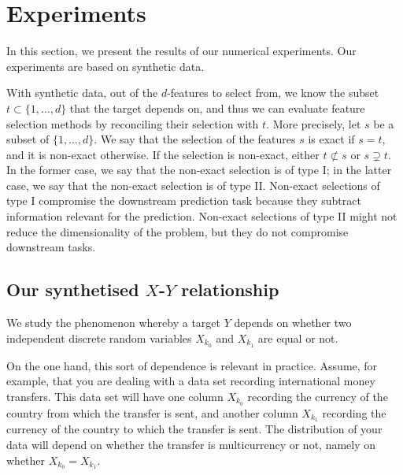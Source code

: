 \section{Experiments}
\label{sec.experiments}
In this section,
we present the results of our numerical experiments.
Our experiments are based
on synthetic data.


With synthetic data, 
out 
of the $d$-features to select from,
we know the subset 
$t \subset \lbrace 1, \dots, d\rbrace$
that the target depends on,
and thus
we can evaluate feature selection methods
by reconciling their selection with $t$.
More precisely,
let 
$s$ 
be a subset of 
$\lbrace1, \dots, d\rbrace$.
We say that 
the selection of the features 
$s$ is exact if $s=t$,
and it is non-exact otherwise. 
If the selection is non-exact,
either 
$t \not \subset s$
or
$s \supsetneq t$.
In the former case, 
we say that the non-exact selection is of type I;
in the latter case,
we say that the non-exact selection is of type II. 
Non-exact selections of type I 
compromise the downstream prediction task 
because 
they subtract information relevant for the prediction.
Non-exact selections of type II
might not reduce the dimensionality of the problem,
but they do not compromise downstream tasks. 


\subsection{Our synthetised $X$-$Y$ relationship}
We study the phenomenon
whereby
a target $Y$ depends
on whether
two independent discrete random variables 
$X_{k_0}$ 
and
$X_{k_1}$
are equal or not.

On the one hand, 
this sort of dependence is relevant in practice.
Assume, 
for example,
that 
you are dealing with a data set recording 
international money transfers.
This data set will have 
one column $X_{k_0}$ recording 
the currency of the country from which the transfer is sent,
and another column $X_{k_1}$ recording
the currency of the country to which the transfer is sent.
The distribution of your data will
depend on whether the transfer is multicurrency or not, 
namely on whether $X_{k_0} = X_{k_1}$.

